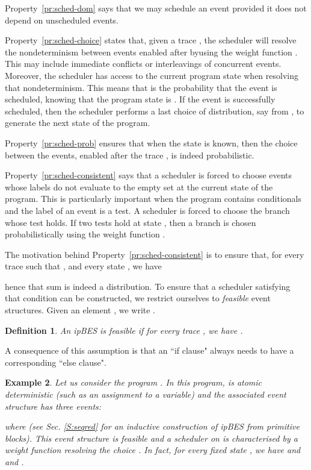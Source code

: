 \documentclass[review]{elsart}
\newtheorem{definition}{Definition}[section]
\newtheorem{example}[definition]{Example}
\newcommand{\Sec}[1]{Sec. \ref{#1}}
\begin{document}
Property~\ref{pr:sched-dom} says that we may schedule an event provided it does not depend on unscheduled events.

Property~\ref{pr:sched-choice} states that, given a trace , the scheduler will resolve the nondeterminism between events enabled after  byusing the weight function . This may include immediate conflicts or interleavings of concurrent events. Moreover, the scheduler has access to the current program state when resolving that nondeterminism. This means that  is the probability that the event  is scheduled, knowing that the program state is . If the event  is successfully scheduled, then the scheduler performs a last choice of distribution, say  from , to generate the next state of the program.

Property~\ref{pr:sched-prob} ensures that when the state  is known, then the choice between the events, enabled after the trace , is indeed probabilistic.  

Property~\ref{pr:sched-consistent} says that a scheduler is forced to choose events whose labels do not evaluate to the empty set at the current state of the program. This is particularly important when the program contains conditionals and the label of an event is a test. A scheduler is forced to choose the branch whose test holds. If two tests hold at state , then a branch is chosen probabilistically using the weight function . 

The motivation behind Property~\ref{pr:sched-consistent} is to ensure that, for every trace  such that , and every state , we have

hence that sum is indeed a distribution. To ensure that a scheduler satisfying that condition can be constructed, we restrict ourselves to \textit{feasible} event structures. Given an element , we write .

\begin{definition}
An ipBES  is \emph{feasible} if for every trace , we have .
\end{definition}

A consequence of this assumption is that an ``if clause" always needs to have a corresponding ``else clause".

\begin{example}
Let us consider the program . In this program,  is  atomic deterministic (such as an assignment to a variable) and the associated event structure has three events:

where  (see \Sec{S:seqred} for an inductive construction of ipBES from primitive blocks). This event structure is feasible and a scheduler  on  is characterised by a weight function  resolving the choice .  In fact, for every fixed state , we have  and  and .
\end{example}
\end{document}
